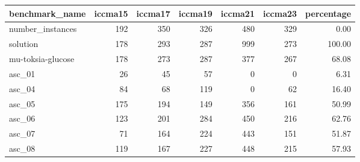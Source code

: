 \begin{tabular}{lrrrrrr}
\toprule
benchmark\_name &  iccma15 &  iccma17 &  iccma19 &  iccma21 &  iccma23 &  percentage \\
\midrule
number\_instances  &      192 &      350 &      326 &      480 &      329 &        0.00 \\
solution          &      178 &      293 &      287 &      999 &      273 &      100.00 \\
mu-toksia-glucose &      178 &      273 &      287 &      377 &      267 &       68.08 \\
asc\_01            &       26 &       45 &       57 &        0 &        0 &        6.31 \\
asc\_04            &       84 &       68 &      119 &        0 &       62 &       16.40 \\
asc\_05            &      175 &      194 &      149 &      356 &      161 &       50.99 \\
asc\_06            &      123 &      201 &      284 &      450 &      216 &       62.76 \\
asc\_07            &       71 &      164 &      224 &      443 &      151 &       51.87 \\
asc\_08            &      119 &      167 &      227 &      448 &      215 &       57.93 \\
\bottomrule
\end{tabular}
